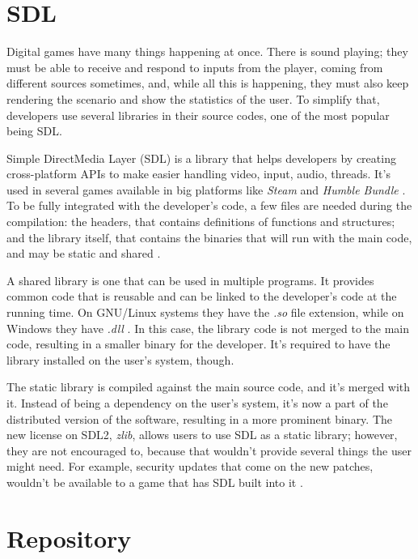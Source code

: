 \section{SDL}
\label {sec:sdl}

Digital games have many things happening at once. There is sound playing; they must be able to receive and respond to inputs from the player, coming from different sources sometimes, and, while all this is happening, they must also keep rendering the scenario and show the statistics of the user. To simplify that, developers use several libraries in their source codes, one of the most popular being SDL.

Simple DirectMedia Layer (SDL) is a library that helps developers by creating cross-platform APIs to make easier handling video, input, audio, threads. It's used in several games available in big platforms like \textit{Steam} and \textit{Humble Bundle} \cite{sdl2017}. To be fully integrated with the developer's code, a few files are needed during the compilation: the headers, that contains definitions of functions and structures; and the library itself, that contains the binaries that will run with the main code, and may be static and shared \cite{mitchell2013sdl}.

A shared library is one that can be used in multiple programs. It provides common code that is reusable and can be linked to the developer's code at the running time. On GNU/Linux systems they have the \textit{.so} file extension, while on Windows they have \textit{.dll} \cite{campbell2009algorithms}. In this case, the library code is not merged to the main code, resulting in a smaller binary for the developer. It's required to have the library installed on the user's system, though.

The static library is compiled against the main source code, and it's merged with it. Instead of being a dependency on the user's system, it's now a part of the distributed version of the software, resulting in a more prominent binary. The new license on SDL2, \textit{zlib}\footnotemark, allows users to use SDL as a static library; however, they are not encouraged to, because that wouldn't provide several things the user might need. For example, security updates that come on the new patches, wouldn't be available to a game that has SDL built into it \cite{ryangordon2017}.



\section{Repository}
\label {sec:repository}

